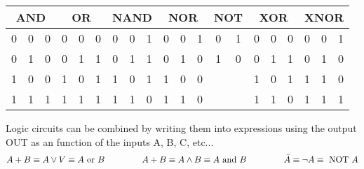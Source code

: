 \begin{center}
	\begin{tabular}{|| c c|c||c c|c||c c|c||c c|c||c|c||c c|c||cc|c||}
		\hline
		\multicolumn{3}{||c||}{AND}&
		\multicolumn{3}{|c||}{OR}&
		\multicolumn{3}{|c||}{NAND}&
		\multicolumn{3}{|c||}{NOR}&
		\multicolumn{2}{|c||}{NOT}&
		\multicolumn{3}{|c||}{XOR}&
		\multicolumn{3}{|c||}{XNOR}\\
		\hline
		0 & 0 & 0 & 
		0 & 0 & 0 & 
		0 & 0 & 1 & 
		0 & 0 & 1 & 
		0 & 1 & 
		0 & 0 & 0 & 
		0 & 0 & 1 \\
		0 & 1 & 0 & 
		0 & 1 & 1 & 
		0 & 1 & 1 & 
		0 & 1 & 0 & 
		1 & 0 & 
		0 & 1 & 1 & 
		0 & 1 & 0 \\
		1 & 0 & 0 & 
		1 & 0 & 1 & 
		1 & 0 & 1 & 
		1 & 0 & 0 & 
		& & 
		1 & 0 & 1 & 
		1 & 1 & 0 \\
		1 & 1 & 1 & 
		1 & 1 & 1 & 
		1 & 1 & 0 & 
		1 & 1 & 0 & 
		&  & 
		1 & 1 & 0 & 
		1 & 1 & 1 \\
		\hline
	\end{tabular}
\end{center}

Logic circuits can be combined by writing them into expressions using the output OUT as an function of the inputs A, B, C, etc...
\begin{align}
A + B \equiv  A \vee V \equiv A \textrm{ or } B  \hspace{1.5cm} A + B \equiv A \wedge B \equiv A \textrm{ and } B \hspace{1.5cm} \bar{A} \equiv \lnot A \equiv \textrm{ NOT } A
\end{align}

